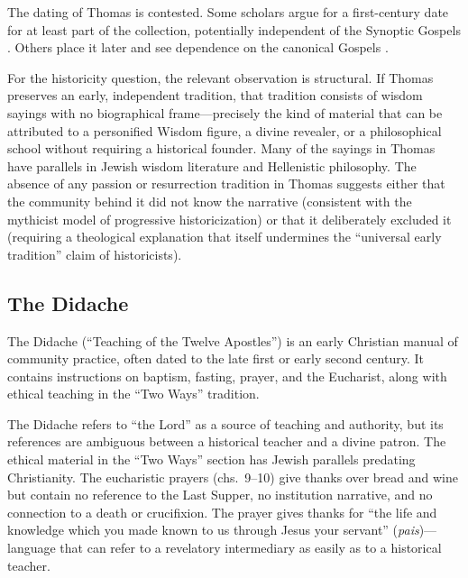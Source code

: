 \documentclass[12pt,oneside]{article}
\newcommand{\grk}[1]{\textit{#1}}   %
\begin{document}
The dating of Thomas is contested.  Some scholars argue for a first-century
date for at least part of the collection, potentially independent of
the Synoptic Gospels \citep{Crossan1991,Patterson1993}.  Others place
it later and see dependence on the canonical Gospels
\citep{Goodacre2012}.

For the historicity question, the relevant observation is structural.
If Thomas preserves an early, independent tradition, that tradition
consists of wisdom sayings with no biographical frame---precisely the
kind of material that can be attributed to a personified Wisdom figure,
a divine revealer, or a philosophical school without requiring a
historical founder.  Many of the sayings in Thomas have parallels in
Jewish wisdom literature and Hellenistic philosophy.  The absence of
any passion or resurrection tradition in Thomas suggests either that the
community behind it did not know the narrative (consistent with the
mythicist model of progressive historicization) or that it deliberately
excluded it (requiring a theological explanation that itself undermines
the ``universal early tradition'' claim of historicists).

\subsection{The Didache}
\label{sec:noncanon:didache}

The Didache (``Teaching of the Twelve Apostles'') is an early Christian
manual of community practice, often dated to the late first or early
second century.  It contains instructions on baptism, fasting, prayer,
and the Eucharist, along with ethical teaching in the ``Two Ways''
tradition.

The Didache refers to ``the Lord'' as a source of teaching and
authority, but its references are ambiguous between a historical teacher
and a divine patron.  The ethical material in the ``Two Ways'' section
has Jewish parallels predating Christianity.  The eucharistic prayers
(chs.~9--10) give thanks over bread and wine but contain no reference
to the Last Supper, no institution narrative, and no connection to
a death or crucifixion.  The prayer gives thanks for ``the life and
knowledge which you made known to us through Jesus your servant''
(\grk{pais})---language that can refer to a revelatory intermediary as
easily as to a historical teacher.
\end{document}
